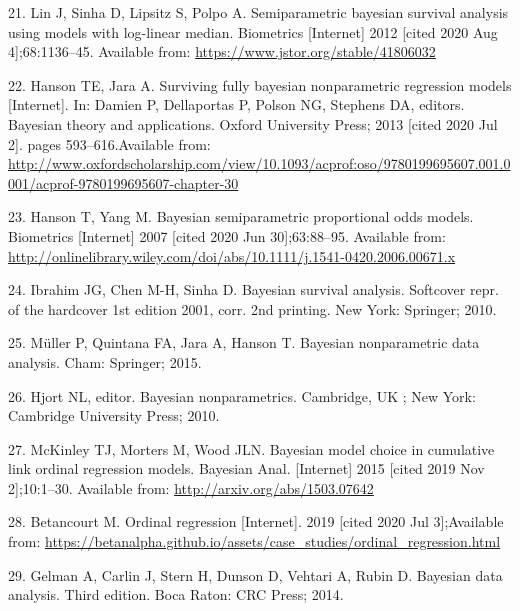 \documentclass[
]{article}
\begin{document}
\leavevmode\hypertarget{ref-lin_semiparametric_2012}{}%
21. Lin J, Sinha D, Lipsitz S, Polpo A. Semiparametric bayesian survival analysis using models with log-linear median. Biometrics {[}Internet{]} 2012 {[}cited 2020 Aug 4{]};68:1136--45. Available from: \url{https://www.jstor.org/stable/41806032}

\leavevmode\hypertarget{ref-damien_surviving_2013}{}%
22. Hanson TE, Jara A. Surviving fully bayesian nonparametric regression models {[}Internet{]}. In: Damien P, Dellaportas P, Polson NG, Stephens DA, editors. Bayesian theory and applications. Oxford University Press; 2013 {[}cited 2020 Jul 2{]}. pages 593--616.Available from: \url{http://www.oxfordscholarship.com/view/10.1093/acprof:oso/9780199695607.001.0001/acprof-9780199695607-chapter-30}

\leavevmode\hypertarget{ref-hanson_bayesian_2007}{}%
23. Hanson T, Yang M. Bayesian semiparametric proportional odds models. Biometrics {[}Internet{]} 2007 {[}cited 2020 Jun 30{]};63:88--95. Available from: \url{http://onlinelibrary.wiley.com/doi/abs/10.1111/j.1541-0420.2006.00671.x}

\leavevmode\hypertarget{ref-ibrahim_bayesian_2010}{}%
24. Ibrahim JG, Chen M-H, Sinha D. Bayesian survival analysis. Softcover repr. of the hardcover 1st edition 2001, corr. 2nd printing. New York: Springer; 2010.

\leavevmode\hypertarget{ref-muller_bayesian_2015}{}%
25. Müller P, Quintana FA, Jara A, Hanson T. Bayesian nonparametric data analysis. Cham: Springer; 2015.

\leavevmode\hypertarget{ref-hjort_bayesian_2010}{}%
26. Hjort NL, editor. Bayesian nonparametrics. Cambridge, UK ; New York: Cambridge University Press; 2010.

\leavevmode\hypertarget{ref-mckinley_bayesian_2015}{}%
27. McKinley TJ, Morters M, Wood JLN. Bayesian model choice in cumulative link ordinal regression models. Bayesian Anal. {[}Internet{]} 2015 {[}cited 2019 Nov 2{]};10:1--30. Available from: \url{http://arxiv.org/abs/1503.07642}

\leavevmode\hypertarget{ref-betancourt_ordinal_2019}{}%
28. Betancourt M. Ordinal regression {[}Internet{]}. 2019 {[}cited 2020 Jul 3{]};Available from: \url{https://betanalpha.github.io/assets/case_studies/ordinal_regression.html}

\leavevmode\hypertarget{ref-gelman_bayesian_2014}{}%
29. Gelman A, Carlin J, Stern H, Dunson D, Vehtari A, Rubin D. Bayesian data analysis. Third edition. Boca Raton: CRC Press; 2014.
\end{document}
